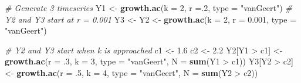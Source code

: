 \documentclass[]{book}
\newenvironment{Shaded}{\begin{snugshade}}{\end{snugshade}}
\newcommand{\KeywordTok}[1]{\textcolor[rgb]{0.13,0.29,0.53}{\textbf{{#1}}}}
\newcommand{\DataTypeTok}[1]{\textcolor[rgb]{0.13,0.29,0.53}{{#1}}}
\newcommand{\DecValTok}[1]{\textcolor[rgb]{0.00,0.00,0.81}{{#1}}}
\newcommand{\FloatTok}[1]{\textcolor[rgb]{0.00,0.00,0.81}{{#1}}}
\newcommand{\StringTok}[1]{\textcolor[rgb]{0.31,0.60,0.02}{{#1}}}
\newcommand{\CommentTok}[1]{\textcolor[rgb]{0.56,0.35,0.01}{\textit{{#1}}}}
\newcommand{\NormalTok}[1]{{#1}}
\begin{document}
\begin{Shaded}
\begin{Highlighting}[]
\CommentTok{# Generate 3 timeseries}
\NormalTok{Y1 <-}\StringTok{ }\KeywordTok{growth.ac}\NormalTok{(}\DataTypeTok{k =} \DecValTok{2}\NormalTok{, }\DataTypeTok{r =}\NormalTok{.}\DecValTok{2}\NormalTok{, }\DataTypeTok{type =} \StringTok{"vanGeert"}\NormalTok{)}
\CommentTok{# Y2 and Y3 start at r = 0.001}
\NormalTok{Y3 <-}\StringTok{ }\NormalTok{Y2 <-}\StringTok{ }\KeywordTok{growth.ac}\NormalTok{(}\DataTypeTok{k =} \DecValTok{2}\NormalTok{, }\DataTypeTok{r =} \FloatTok{0.001}\NormalTok{, }\DataTypeTok{type =} \StringTok{"vanGeert"}\NormalTok{)}

\CommentTok{# Y2 and Y3 start when k is approached}
\NormalTok{c1 <-}\StringTok{ }\FloatTok{1.6}
\NormalTok{c2 <-}\StringTok{ }\FloatTok{2.2}
\NormalTok{Y2[Y1 >}\StringTok{ }\NormalTok{c1] <-}\StringTok{ }\KeywordTok{growth.ac}\NormalTok{(}\DataTypeTok{r =} \NormalTok{.}\DecValTok{3}\NormalTok{, }\DataTypeTok{k =} \DecValTok{3}\NormalTok{, }\DataTypeTok{type =} \StringTok{"vanGeert"}\NormalTok{, }\DataTypeTok{N =} \KeywordTok{sum}\NormalTok{(Y1 >}\StringTok{ }\NormalTok{c1))}
\NormalTok{Y3[Y2 >}\StringTok{ }\NormalTok{c2] <-}\StringTok{ }\KeywordTok{growth.ac}\NormalTok{(}\DataTypeTok{r =} \NormalTok{.}\DecValTok{5}\NormalTok{, }\DataTypeTok{k =} \DecValTok{4}\NormalTok{, }\DataTypeTok{type =} \StringTok{"vanGeert"}\NormalTok{, }\DataTypeTok{N =} \KeywordTok{sum}\NormalTok{(Y2 >}\StringTok{ }\NormalTok{c2))}


\end{Highlighting}
\end{Shaded}
\end{document}
